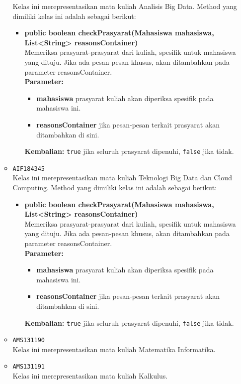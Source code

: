 \begin{enumerate}
\begin{itemize}
Kelas ini merepresentasikan mata kuliah Analisis Big Data. Method yang dimiliki kelas ini adalah sebagai berikut: 
\begin{itemize}
\item \textbf{public boolean checkPrasyarat(Mahasiswa mahasiswa, List<String> reasonsContainer)}\\
Memeriksa prasyarat-prasyarat dari kuliah, spesifik untuk mahasiswa yang dituju. Jika ada pesan-pesan khusus, akan ditambahkan pada parameter reasonsContainer.\\
\textbf{Parameter:}
\begin{itemize}
\item \textbf{mahasiswa} prasyarat kuliah akan diperiksa spesifik pada mahasiswa ini.
\item \textbf{reasonsContainer} jika pesan-pesan terkait prasyarat akan ditambahkan di sini.
\end{itemize}
\textbf{Kembalian:} \texttt{true} jika seluruh prasyarat dipenuhi, \texttt{false} jika tidak.
\end{itemize}
\item \texttt{AIF184345} \\
Kelas ini merepresentasikan mata kuliah Teknologi Big Data dan Cloud Computing. Method yang dimiliki kelas ini adalah sebagai berikut: 
\begin{itemize}
\item \textbf{public boolean checkPrasyarat(Mahasiswa mahasiswa, List<String> reasonsContainer)}\\
Memeriksa prasyarat-prasyarat dari kuliah, spesifik untuk mahasiswa yang dituju. Jika ada pesan-pesan khusus, akan ditambahkan pada parameter reasonsContainer.\\
\textbf{Parameter:}
\begin{itemize}
\item \textbf{mahasiswa} prasyarat kuliah akan diperiksa spesifik pada mahasiswa ini.
\item \textbf{reasonsContainer} jika pesan-pesan terkait prasyarat akan ditambahkan di sini.
\end{itemize}
\textbf{Kembalian:} \texttt{true} jika seluruh prasyarat dipenuhi, \texttt{false} jika tidak.
\end{itemize}
\item \texttt{AMS131190} \\
Kelas ini merepresentasikan mata kuliah Matematika Informatika.
\item \texttt{AMS131191} \\
Kelas ini merepresentasikan mata kuliah Kalkulus.

\end{itemize}
\end{enumerate}
